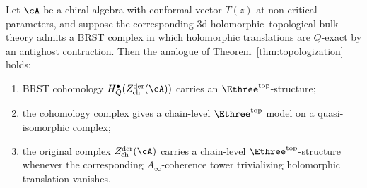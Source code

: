 \begin{conjecture}
\label{conj:topologization-general}
\ClaimStatusConjectured
{}
Let $\cA$ be a chiral algebra with conformal vector
$T(z)$ at non-critical parameters, and suppose the
corresponding $3$d holomorphic--topological bulk theory
admits a BRST complex in which holomorphic translations are
$Q$-exact by an antighost contraction. Then the analogue of
Theorem~\ref{thm:topologization} holds:
\begin{enumerate}[label=\textup{(\roman*)}]
\item BRST cohomology
 $H_Q^\bullet(Z^{\mathrm{der}}_{\mathrm{ch}}(\cA))$
 carries an $\Ethree^{\mathrm{top}}$-structure;
\item the cohomology complex gives a chain-level
 $\Ethree^{\mathrm{top}}$ model on a quasi-isomorphic
 complex;
\item the original complex
 $Z^{\mathrm{der}}_{\mathrm{ch}}(\cA)$ carries a
 chain-level $\Ethree^{\mathrm{top}}$-structure whenever
 the corresponding $A_\infty$-coherence tower trivializing
 holomorphic translation vanishes.
\end{enumerate}
\end{conjecture}

